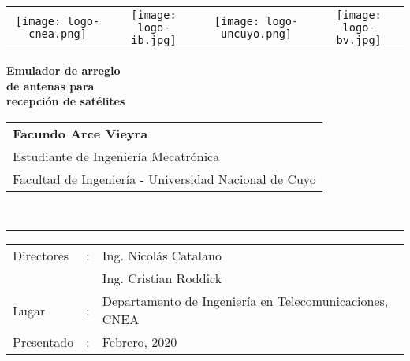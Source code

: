 \documentclass{article}
\newenvironment{standalone}{\begin{preview}}{\end{preview}}
\begin{document}
\begin{standalone}

  \begin{tabular*}{\textwidth}{@{\extracolsep{\fill}} cccc}
    \texttt{[image: logo-cnea.png]}&
    \texttt{[image: logo-ib.jpg]}&
    \texttt{[image: logo-uncuyo.png]}&
    \texttt{[image: logo-bv.jpg]}\\
  \end{tabular*}

  \vspace{4cm}

  \parbox{\textwidth}{
  \begin{center}
    \Huge \textbf{%
    Emulador de arreglo \\[1.2ex]
    de antenas para \\[1.2ex]
    recepción de satélites
    }
  \end{center}
  }

  \vfill

  {\fontsize{12}{12} \selectfont%
  \begin{tabular}{l}
    \textbf{Facundo Arce Vieyra}\\[1.0ex]
    Estudiante de Ingeniería Mecatrónica\\
    Facultad de Ingeniería - Universidad Nacional de Cuyo\\[1.0ex]
  \end{tabular}
  }\\

  \vspace{1cm}
  \hrule
  \vspace{1cm}

  {\fontsize{12pt}{12} \selectfont%
  \begin{tabular}{lcl}
    Directores &:& Ing. Nicolás Catalano\\[0.75ex]
    & & Ing. Cristian Roddick\\[1.5ex]
    Lugar &:& Departamento de Ingeniería en Telecomunicaciones, CNEA\\[1.5ex]
    Presentado &:& Febrero, 2020\\
  \end{tabular}
  }


\end{standalone}
\end{document}
